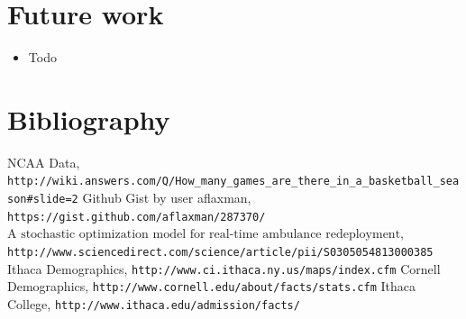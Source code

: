 \documentclass[titlepage]{article}
\begin{document}
\section{Future work}
\begin{itemize}
\item Todo
\end{itemize}

\pagebreak

\section{Bibliography}
\begin{thebibliography}{9}

 NCAA Data,
\verb|http://wiki.answers.com/Q/How_many_games_are_there_in_a_basketball_season#slide=2|
 Github Gist by user aflaxman,
\verb|https://gist.github.com/aflaxman/287370/|
 $\text{A stochastic optimization model for real-time ambulance redeployment}$,
\\\verb|http://www.sciencedirect.com/science/article/pii/S0305054813000385|
 Ithaca Demographics,
\verb|http://www.ci.ithaca.ny.us/maps/index.cfm|
 Cornell Demographics,
\verb|http://www.cornell.edu/about/facts/stats.cfm|
 Ithaca College,
\verb|http://www.ithaca.edu/admission/facts/|


\end{thebibliography}
\end{document}
